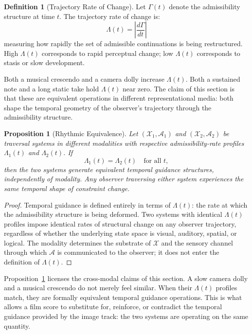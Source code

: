 \documentclass[12pt, a4paper]{article}
\theoremstyle{plain}
\newtheorem{proposition}[theorem]{Proposition}
\theoremstyle{definition}
\newtheorem{definition}[theorem]{Definition}
\theoremstyle{remark}
\newcommand{\X}{\mathcal{X}}
\newcommand{\A}{\mathcal{A}}
\newcommand{\Traj}{\Gamma}
\begin{document}
\begin{definition}[Trajectory Rate of Change]
  Let $\Traj(t)$ denote the admissibility structure at time
  $t$. The trajectory rate of change is:
  \begin{equation}
    \Lambda(t) = \left| \frac{d\Traj}{dt} \right|
  \end{equation}
  measuring how rapidly the set of admissible continuations
  is being restructured. High $\Lambda(t)$ corresponds to
  rapid perceptual change; low $\Lambda(t)$ corresponds to
  stasis or slow development.
\end{definition}

Both a musical crescendo and a camera dolly increase
$\Lambda(t)$. Both a sustained note and a long static take
hold $\Lambda(t)$ near zero. The claim of this section is
that these are equivalent operations in different
representational media: both shape the temporal geometry of
the observer's trajectory through the admissibility
structure.

\begin{proposition}[Rhythmic Equivalence]
\label{prop:rhythmic_equivalence}
  Let $(\X_1, \A_1)$ and $(\X_2, \A_2)$ be traversal
  systems in different modalities with respective
  admissibility-rate profiles $\Lambda_1(t)$ and
  $\Lambda_2(t)$. If
  \begin{equation}
    \Lambda_1(t) = \Lambda_2(t) \quad \text{for all } t,
  \end{equation}
  then the two systems generate equivalent temporal guidance
  structures, independently of modality. Any observer
  traversing either system experiences the same temporal
  shape of constraint change.
\end{proposition}

\begin{proof}
  Temporal guidance is defined entirely in terms of
  $\Lambda(t)$: the rate at which the admissibility
  structure is being deformed. Two systems with identical
  $\Lambda(t)$ profiles impose identical rates of
  structural change on any observer trajectory, regardless
  of whether the underlying state space is visual,
  auditory, spatial, or logical. The modality determines
  the substrate of $\X$ and the sensory channel through
  which $\A$ is communicated to the observer; it does not
  enter the definition of $\Lambda(t)$.
\end{proof}

Proposition~\ref{prop:rhythmic_equivalence} licenses the
cross-modal claims of this section. A slow camera dolly
and a musical crescendo do not merely feel similar. When
their $\Lambda(t)$ profiles match, they are formally
equivalent temporal guidance operations. This is what
allows a film score to substitute for, reinforce, or
contradict the temporal guidance provided by the image
track: the two systems are operating on the same quantity.
\end{document}
